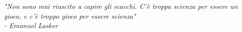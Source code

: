 \begin{titlepage}

\nonumber
\null {}
	\begin{flushright}
\textit{"Non sono mai riuscito a capire gli scacchi. C'è troppa scienza per essere un gioco, e c'è troppo gioco per essere scienza"\\- Emanuel Lasker} \\[5mm]
	\end{flushright}



\end{titlepage}